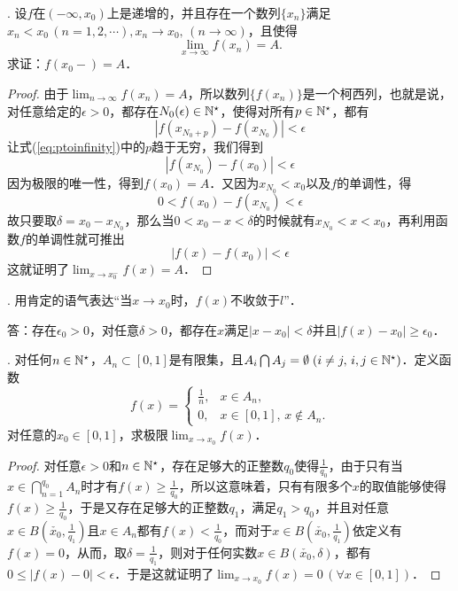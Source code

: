 . 设$f$在$(-\infty, x_0)$上是递增的，并且存在一个数列$\{ x_n \}$满足$x_n < x_0 \, (n = 1,2,\cdots), x_n \to x_0, \, (n \to \infty)$，且使得
\begin{equation}
    \lim_{x \to \infty} f(x_n) = A.
\end{equation}
求证：$f(x_0 -) = A$．

\begin{proof}
由于$\displaystyle\lim_{n \to \infty} f(x_n) = A$，所以数列$\{ f(x_n) \}$是一个柯西列，也就是说，对任意给定的$\epsilon > 0$，都存在$N_0(\epsilon) \in \mathbb{N}^\star$，使得对所有$p \in \mathbb{N}^\star$，都有
\begin{equation}
    |f(x_{N_0+p}) - f(x_{N_0})|<\epsilon
    \label{eq:ptoinfinity}
\end{equation}
让式(\ref{eq:ptoinfinity})中的$p$趋于无穷，我们得到
\begin{equation}
    |f(x_{N_0}) - f(x_0)|<\epsilon
\end{equation}
因为极限的唯一性，得到$f(x_0)=A$．又因为$x_{N_0}<x_0$以及$f$的单调性，得
\begin{equation}
    0 < f(x_0) - f(x_{N_0}) < \epsilon
\end{equation}
故只要取$\delta = x_0 - x_{N_0}$，那么当$0 < x_0 - x < \delta$的时候就有$x_{N_0}<x<x_0$，再利用函数$f$的单调性就可推出
\begin{equation}
    |f(x)-f(x_0)|<\epsilon
\end{equation}
这就证明了$\displaystyle\lim_{x \to x_0^-} f(x) = A$．
\end{proof}

. 用肯定的语气表达``当$x \to x_0$时，$f(x)$不收敛于$l$''．

\noindent 答：存在$\epsilon_0 > 0$，对任意$\delta > 0$，都存在$x$满足$|x-x_0|<\delta$并且$|f(x)-x_0|\geq\epsilon_0$．

. 对任何$n \in \mathbb{N}^\star$，$A_n \subset [0,1]$是有限集，且$A_i \bigcap A_j = \emptyset \; (i \neq j, \, i,j \in \mathbb{N}^\star)$．定义函数
\begin{equation}
    f(x) = \begin{cases}
        \displaystyle\frac{1}{n}, & x \in A_n , \\
        0, & x \in [0,1], \, x \not\in A_n.
    \end{cases}
\end{equation}
对任意的$x_0 \in [0,1]$，求极限$\displaystyle\lim_{x \to x_0} f(x)$．

\begin{proof}
对任意$\epsilon > 0$和$n \in \mathbb{N}^\star$，存在足够大的正整数$q_0$使得$\displaystyle\frac{1}{q_0}$，由于只有当$x \in \displaystyle\bigcap_{n=1}^{q_0} A_n$时才有$f(x) \geq \displaystyle\frac{1}{q_0}$，所以这意味着，只有有限多个$x$的取值能够使得$f(x) \geq \displaystyle\frac{1}{q_0}$，于是又存在足够大的正整数$q_1$，满足$q_1 > q_0$，并且对任意$x \in B(\check{x_0}, \displaystyle\frac{1}{q_1})$且$x \in A_n$都有$f(x) < \displaystyle\frac{1}{q_0}$，而对于$x \in B(\check{x_0}, \displaystyle\frac{1}{q_1})$依定义有$f(x) = 0$，从而，取$\delta = \displaystyle\frac{1}{q_1}$，则对于任何实数$x \in B(\check{x_0}, \delta)$，都有$0 \leq |f(x) - 0| < \epsilon$．于是这就证明了$\displaystyle\lim_{x \to x_0} f(x) = 0 \, (\forall x \in [0,1])$．
\end{proof}

